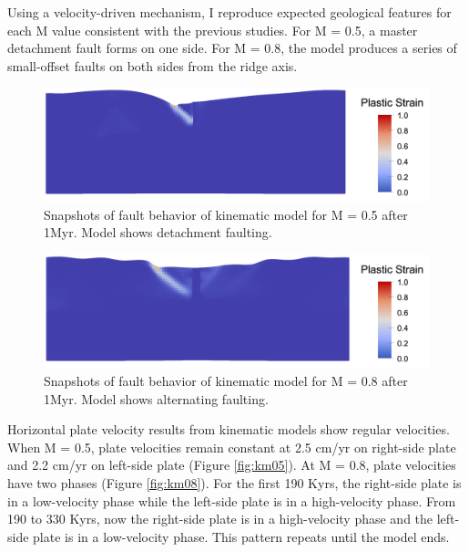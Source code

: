 \documentclass[letterpaper,12pt,notitle]{memphisthesis}                     %
\begin{document}
Using a velocity-driven mechanism, I reproduce expected geological features for each M value consistent with the previous studies. For M = 0.5, a master detachment fault forms on one side. For M = 0.8, the model produces a series of small-offset faults on both sides from the ridge axis.

\begin{figure}[!htb]
	\centering
	\includegraphics[width=0.9\linewidth]{./figs/kfault_m05.png}
	\caption{Snapshots of fault behavior of kinematic model for M = 0.5 after 1Myr. Model shows detachment faulting.}
	\label{fig:kfault_m05}
\end{figure}
\begin{figure}[!htb]
	\centering
	\includegraphics[width=0.9\linewidth]{./figs/kfault_m08.png}
	\caption{Snapshots of fault behavior of kinematic model for M = 0.8 after 1Myr. Model shows alternating faulting.}
	\label{fig:kfault_m05}
\end{figure}

Horizontal plate velocity results from kinematic models show regular velocities. When M = 0.5, plate velocities remain constant at 2.5 cm/yr on right-side plate and 2.2 cm/yr on left-side plate (Figure \ref{fig:km05}). At M = 0.8, plate velocities have two phases (Figure \ref{fig:km08}). For the first 190 Kyrs, the right-side plate is in a low-velocity phase while the left-side plate is in a high-velocity phase. From 190 to 330 Kyrs, now the right-side plate is in a high-velocity phase and the left-side plate is in a low-velocity phase. This pattern repeats until the model ends.
\end{document}

